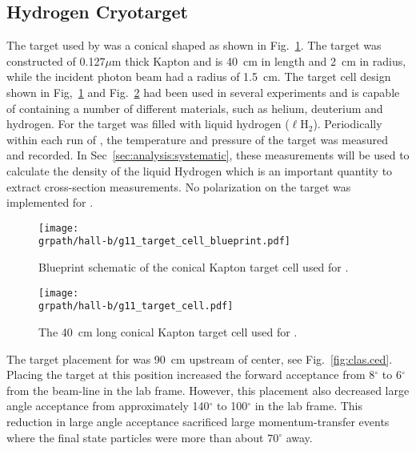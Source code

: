 \subsection{Hydrogen Cryotarget}\label{sec:clas.tgt}


The target used by  was a conical shaped as shown in Fig.~\ref{fig:clas.targetblueprint}. The target was constructed of 0.127$\mu$m thick Kapton and is 40~cm in length and 2~cm in radius, while the incident photon beam had a radius of 1.5~cm. The target cell design shown in Fig,~\ref{fig:clas.targetblueprint} and Fig.~\ref{fig:clas.targetcell} had been used in several experiments and is capable of containing a number of different materials, such as helium, deuterium and hydrogen. For  the target was filled with liquid hydrogen ($\ell$H$_2$). Periodically within each run of , the temperature and pressure of the target was measured and recorded. In Sec~\ref{sec:analysis:systematic}, these measurements will be used to calculate the density of the liquid Hydrogen which is an important quantity to extract cross-section measurements. No polarization on the target was implemented for .

\begin{figure}[h!]\begin{center}
\texttt{[image: \\grpath/hall-b/g11\_target\_cell\_blueprint.pdf]}
\caption[ Target schematic]{\label{fig:clas.targetblueprint}Blueprint schematic of the conical Kapton target cell used for .}
\end{center}\end{figure}

\begin{figure}[h!]\begin{center}
\texttt{[image: \\grpath/hall-b/g11\_target\_cell.pdf]}
\caption[ Target]{\label{fig:clas.targetcell}The 40~cm long conical Kapton target cell used for .}
\end{center}\end{figure}

The target placement for  was 90~cm upstream of  center, see Fig.~\ref{fig:clas.ced}.
Placing the target at this position increased the forward acceptance from 8$^\circ$  to 6$^\circ$ from the beam-line in the lab frame. However, this placement also decreased large angle acceptance from approximately 140$^\circ$ to 100$^\circ$ in the lab frame. This reduction in large angle acceptance sacrificed large momentum-transfer events where the final state particles were more than about 70$^\circ$ away.
